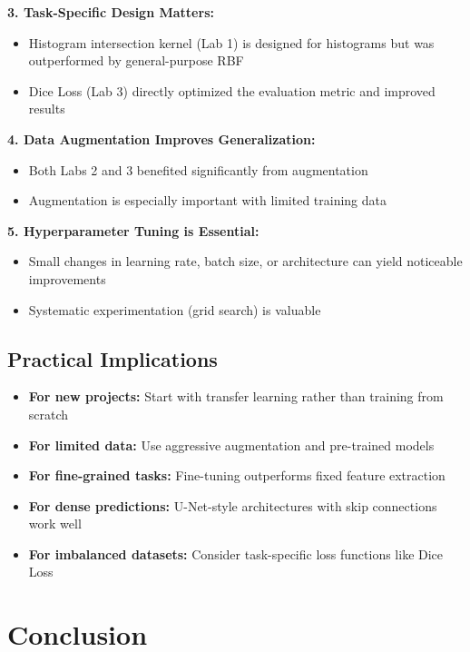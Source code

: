 \documentclass[conference]{IEEEtran}
\begin{document}
\textbf{3. Task-Specific Design Matters:}
\begin{itemize}
\item Histogram intersection kernel (Lab 1) is designed for histograms but was outperformed by general-purpose RBF
\item Dice Loss (Lab 3) directly optimized the evaluation metric and improved results
\end{itemize}

\textbf{4. Data Augmentation Improves Generalization:}
\begin{itemize}
\item Both Labs 2 and 3 benefited significantly from augmentation
\item Augmentation is especially important with limited training data
\end{itemize}

\textbf{5. Hyperparameter Tuning is Essential:}
\begin{itemize}
\item Small changes in learning rate, batch size, or architecture can yield noticeable improvements
\item Systematic experimentation (grid search) is valuable
\end{itemize}

\subsection{Practical Implications}

\begin{itemize}
\item \textbf{For new projects:} Start with transfer learning rather than training from scratch
\item \textbf{For limited data:} Use aggressive augmentation and pre-trained models
\item \textbf{For fine-grained tasks:} Fine-tuning outperforms fixed feature extraction
\item \textbf{For dense predictions:} U-Net-style architectures with skip connections work well
\item \textbf{For imbalanced datasets:} Consider task-specific loss functions like Dice Loss
\end{itemize}

\section{Conclusion}
\end{document}
